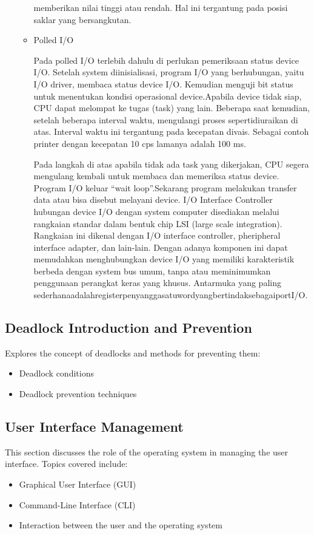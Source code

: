 \documentclass[12pt]{article}
\begin{document}
\begin{itemize}
\begin{itemize}
memberikan nilai tinggi atau rendah. Hal ini tergantung pada posisi saklar yang
bersangkutan.
\newline 
\item  Polled I/O
\par  Pada polled I/O terlebih dahulu di perlukan pemeriksaan status device I/O. Setelah
system diinisialisasi, program I/O yang berhubungan, yaitu I/O driver, membaca
status device I/O. Kemudian menguji bit status untuk menentukan kondisi operasional
device.Apabila device tidak siap, CPU dapat melompat ke tugas (task) yang
lain. Beberapa saat kemudian, setelah beberapa interval waktu, mengulangi proses
sepertidiuraikan di atas. Interval waktu ini tergantung pada kecepatan divais. Sebagai
contoh printer dengan kecepatan 10 cps lamanya adalah 100 ms.
\newline
\par Pada langkah di atas apabila tidak ada task yang dikerjakan, CPU segera mengulang
kembali untuk membaca dan memeriksa status device. Program I/O keluar “wait
loop”.Sekarang program melakukan transfer data atau bisa disebut melayani device.
I/O Interface Controller hubungan device I/O dengan system computer disediakan
melalui rangkaian standar dalam bentuk chip LSI (large scale integration). Rangkaian
ini dikenal dengan I/O interface controller, pheripheral interface adapter, dan
lain-lain. Dengan adanya komponen ini dapat memudahkan menghubungkan device
I/O yang memiliki karakteristik berbeda dengan system bus umum, tanpa atau
meminimumkan penggunaan perangkat keras yang khusus. Antarmuka yang paling
sederhanaadalahregisterpenyanggasatuwordyangbertindaksebagaiportI/O.
\end{itemize}
\end{itemize}

\subsection{Deadlock Introduction and Prevention}
Explores the concept of deadlocks and methods for preventing them:
\begin{itemize}
    \item Deadlock conditions
    \item Deadlock prevention techniques
\end{itemize}

\subsection{User Interface Management}
This section discusses the role of the operating system in managing the user interface. Topics covered include:
\begin{itemize}
    \item Graphical User Interface (GUI)
    \item Command-Line Interface (CLI)
    \item Interaction between the user and the operating system
\end{itemize}
\end{document}
